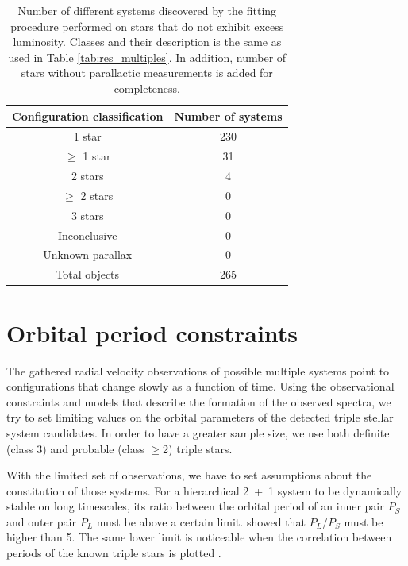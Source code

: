 \begin{table}
	\centering
	\caption{Number of different systems discovered by the fitting procedure performed on stars that do not exhibit excess luminosity. Classes and their description is the same as used in Table \ref{tab:res_multiples}. In addition, number of stars without parallactic measurements is added for completeness.}
	\begin{tabular}{c c}
		\hline \hline
		Configuration classification & Number of systems \\ 
		\hline
		1 star & 230 \\
		$\geq$ 1 star & 31 \\
		2 stars & 4 \\
		$\geq$ 2 stars & 0 \\
		3 stars & 0 \\
		Inconclusive & 0 \\
		Unknown parallax & 0 \\
		\hline
		Total objects & 265 \\
		\hline
	\end{tabular}
	\label{tab:res_single}
\end{table}


\section{Orbital period constraints}
\label{sec:orital_periods}
The gathered radial velocity observations of possible multiple systems point to configurations that change slowly as a function of time. Using the observational constraints and models that describe the formation of the observed spectra, we try to set limiting values on the orbital parameters of the detected triple stellar system candidates. In order to have a greater sample size, we use both definite (class 3) and probable (class $\geq$2) triple stars.

With the limited set of observations, we have to set assumptions about the constitution of those systems. For a hierarchical 2~+~1 system to be dynamically stable on long timescales, its ratio between the orbital period of an inner pair $P_S$ and outer pair $P_L$ must be above a certain limit. \citet{2006epbm.book.....E} showed that $P_L$/$P_S$ must be higher than 5. The same lower limit is noticeable when the correlation between periods of the known triple stars is plotted \cite{2008MNRAS.389..925T, 2018ApJS..235....6T}.

